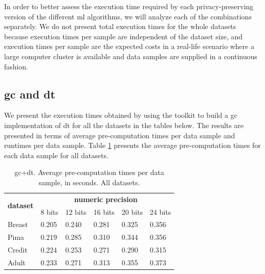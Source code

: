 In order to better assess the execution time required by each privacy-preserving version of the different \ac{ml} algorithms, we will analyze each of the combinations separately. We do not present total execution times for the whole datasets because execution times per sample are independent of the dataset size, and execution times per sample are the expected costs in a real-life scenario where a large computer cluster is available and data samples are supplied in a continuous fashion.


\subsection{\acl{gc} and \acl{dt}}

We present the execution times obtained by using the toolkit to build a \ac{gc} implementation of \ac{dt} for all the datasets in the tables below. The results are presented in terms of average pre-computation times per data sample and runtimes per data sample. Table \ref{table:avgDTAllDatasets} presents the average pre-computation times for each data sample for all datasets.


\begin{table}[htp]
\centering
\caption{\acs{gc}+\acs{dt}. Average pre-computation times per data sample, in seconds. All datasets.}
\label{table:avgDTAllDatasets}
\begin{tabular}{|l|l|l|l|l|l|}
\hline
\multicolumn{1}{|c|}{\multirow{2}{*}{\textbf{dataset}}} & \multicolumn{5}{c|}{\textbf{numeric precision}}                                             \\ \cline{2-6} 
\multicolumn{1}{|c|}{}                                  & 8 bits & 12 bits & 16 bits & 20 bits & 24 bits \\ \hline
Breast                                                  & 0.205           & 0.240            & 0.281            & 0.325            & 0.356            \\ \hline
Pima                                                    & 0.219           & 0.285            & 0.310            & 0.344            & 0.356            \\ \hline
Credit                                                  & 0.224           & 0.253            & 0.271            & 0.290            & 0.315            \\ \hline
Adult                                                   & 0.233           & 0.271            & 0.313            & 0.355            & 0.373            \\ \hline
\end{tabular}
\end{table}


